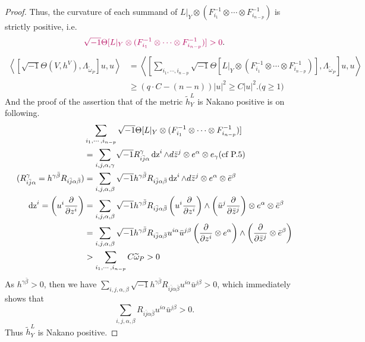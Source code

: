 \documentclass[lang=en,12pt]{beautybook}
\begin{document}
\begin{proof}
    Thus, the curvature of each summand of $L |_Y \otimes  (F_{i_1}^{-
    1} \otimes \cdots \otimes F_{i_{n - p}}^{- 1})$ is strictly positive, i.e.
    \[{\color[HTML]{B4005A}\sqrt{- 1} \Theta [L |_Y \otimes (F_{i_1}^{- 1} \otimes \cdots \otimes F_{i_{n - p}}^{- 1})]> 0}.
    \]
    \begin{align*}
        \left\langle \left[ \sqrt{- 1} \Theta (V, h^V), \Lambda_{\widetilde{\omega}_P}\right] u, u \right\rangle & =  \left\langle \left[ \sum_{i_1, \cdots, i_{n - p}}\sqrt{- 1} \Theta [L |_Y \otimes  (F_{i_1}^{- 1} \otimes \cdots\otimes F_{i_{n - p}}^{- 1})], \Lambda_{\widetilde{\omega}_P} \right] u, u\right\rangle\\
        & \geqslant (q\cdot C-(n-n))|u|^2\geqslant C|u|^2. \text{($q\geqslant 1$)}
    \end{align*}
    \clearpage
    And the proof of the assertion that of the metric $\widetilde{h}^{L }_Y$ is Nakano
    positive is on following.
    \begin{align*}
        &\sum_{i_1, \cdots, i_{n - p}} \sqrt{- 1} \Theta [L |_Y \otimes 
        (F_{i_1}^{- 1} \otimes \cdots \otimes F_{i_{n - p}}^{- 1})] \\
        & =  \sum_{i,j, \alpha, \gamma} \sqrt{- 1} R_{i \bar{j} \alpha}^{\gamma} \operatorname{dz}^i
        \wedge d \bar{z}^j \otimes e^{\alpha} \otimes e_{\gamma}  (\textrm{cf P.5} )\\
        (R_{i \bar{j} \alpha}^{\gamma} = h^{\gamma \bar{\beta}} R_{i \bar{j} \alpha\bar{\beta}} ) & =  \sum_{i, j, \alpha, \beta} \sqrt{- 1} h^{\gamma
        \bar{\beta}} R_{i \bar{j} \alpha \bar{\beta}}  \operatorname{dz}^i \wedge d\bar{z}^j \otimes e^{\alpha} \otimes \bar{e}^{\beta}\\
        \operatorname{dz}^i = \left( u^i \frac{\partial}{\partial z^i} \right) & = \sum_{i, j, \alpha, \beta} \sqrt{- 1} h^{\gamma \bar{\beta}} R_{i \bar{j}
        \alpha \bar{\beta}}   \left( u^i \frac{\partial}{\partial z^i} \right)\wedge \left( \bar{u}^j \frac{\partial}{\partial \bar{z}^j} \right) \otimes e^{\alpha} \otimes \bar{e}^{\beta}\\
        & =  \sum_{i, j, \alpha, \beta} \sqrt{- 1} h^{\gamma \bar{\beta}} R_{i\bar{j} \alpha \bar{\beta}}  u^{i \alpha} \bar{u}^{j \beta} \left( \frac{\partial}{\partial z^i} \otimes e^{\alpha} \right) \wedge \left( \frac{\partial}{\partial\bar{z}^j} \otimes \bar{e}^{\beta} \right)\\
        & >  \sum_{i_1, \cdots, i_{n - p}} C \widetilde{\omega}_P > 0
    \end{align*}
    As $h^{\gamma\bar{\beta}}>0$, then we have $\sum_{i, j, \alpha, \beta} \sqrt{- 1} h^{\gamma \bar{\beta}} R_{i
    \bar{j} \alpha \bar{\beta}}  u^{i \alpha} \bar{u}^{j \beta}>0$, which immediately shows that $$\sum_{i, j, \alpha, \beta} R_{i
    \bar{j} \alpha \bar{\beta}}  u^{i \alpha} \bar{u}^{j \beta}>0.$$ Thus $\widetilde{h}^{L }_Y$ is Nakano positive. 
\end{proof}
\end{document}
